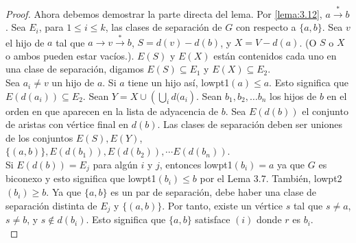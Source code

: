 \begin{proof}
Ahora debemos demostrar la parte directa del lema. Por \ref{lema:3.12}, $a \overset{\ast}{\rightarrow} b$. Sea $E_{i}$, para $1 \leq i \leq k$, las clases de separación de $G$ con respecto a $\{a, b\}$. Sea $v$ el hijo de $a$ tal que $a \rightarrow v  \overset{\ast}{\rightarrow} b$, $S =  d\left(v\right) - d\left(b\right)$, y $X = V - d\left(a\right)$. (O $S$ o $X$ o ambos pueden estar vacíos.). $E\left(S\right)$ y $E\left(X\right)$ están contenidos cada uno en una clase de separación, digamos $E\left(S\right) \subseteq E_{1}$ y $E\left(X\right) \subseteq E_{2}$.\\

Sea $a_{i} \neq v$ un hijo de $a$. Si $a$ tiene un hijo así, lowpt1$\left(a\right) \le a$. Esto significa que $E\left(d\left(a_{i}\right)\right) \subseteq E_{2}$. Sean $Y = X \cup \left(\bigcup_{i}d(a_{i}\right)$. Sean $b_{1}, b_{2}, \ldots b_{n}$ los hijos de $b$ en el orden en que aparecen en la lista de adyacencia de $b$. Sea $E\left(d\left(b\right)\right)$ el conjunto de aristas con vértice final en $d\left(b\right)$. Las clases de separación deben ser uniones de los conjuntos $E\left(S\right), E\left(Y\right)$, $\{\left(a, b\right)\}, E\left(d\left(b_{1}\right)\right), E\left(d\left(b_{2}\right)\right), \cdots E\left(d\left(b_{n}\right)\right)$.\\

Si $E\left(d\left(b\right)\right) = E_{j}$ para algún $i$ y $j$, entonces lowpt1$\left(b_{i}\right) = a$ ya que $G$ es biconexo y esto significa que lowpt1$\left(b_{i}\right) \le b$ por el Lema 3.7. También, lowpt2$\left(b_{i}\right) \geq b$. Ya que $\{a, b\}$ es un par de separación, debe haber una clase de separación distinta de $E_{j}$ y $\{\left(a, b\right)\}$. Por tanto, existe un vértice $s$ tal que $s \neq a$, $s \neq b$, y $s \notin d\left(b_{i}\right)$. Esto significa que $\{a, b\}$ satisface $\left(i\right)$ donde $r$ es $b_{i}$.\\


\end{proof}
